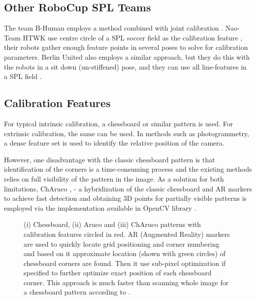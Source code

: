 \documentclass[english, printversion, nomenclature, notitle]{tuvisionthesis} %
\begin{document}
\subsection{Other RoboCup SPL Teams}
\label{subsec:other_extrinsic_calib}
The team B-Human employs a method combined with joint calibration \cite{thomas_rofer_b-human_2018}. Nao-Team HTWK use centre circle of a SPL soccer field as the calibration feature \cite{rico_tilgner_nto-team_2019}, their robots gather enough feature points in several poses to solve for calibration parameters. Berlin United also employs a similar approach, but they do this with the robots in a sit down (un-stiffened) pose, and they can use all line-features in a SPL field \cite{Berlin_United_TRR}.

\subsection{Calibration Features}

For typical intrinsic calibration, a chessboard or similar pattern is used. For extrinsic calibration, the same can be used. In methods such as photogrammetry, a dense feature set is used to identify the relative position of the camera. 

However, one disadvantage with the classic chessboard pattern is that identification of the corners is a time-consuming process and the existing methods relies on full visibility of the pattern in the image. As a solution for both limitations, ChAruco \cite{garrido-jurado_generation_2016}, \cite{romero-ramirez_speeded_2018} - a hybridization of the classic chessboard and AR markers to achieve fast detection and obtaining 3D points for partially visible patterns is employed via the implementation available in OpenCV library \cite{opencv_library}.

\begin{center}
	\begin{figure}
		\def\svgwidth{\linewidth}
		
		\caption[Chessboard, Aruco and ChAruco patterns.]{(i) Chessboard, (ii) Aruco and (iii) ChAruco patterns with calibration features circled in red. AR (Augmented Reality) markers are used to quickly locate grid positioning and corner numbering and based on it approximate location (shown with green circles) of chessboard corners are found. Then it use sub-pixel optimization if specified to further optimize exact position of each chessboard corner. This approach is much faster than scanning whole image for a chessboard pattern according to \cite{romero-ramirez_speeded_2018}.}
		\label{fig:charuco}
	\end{figure}
\end{center}
\end{document}
